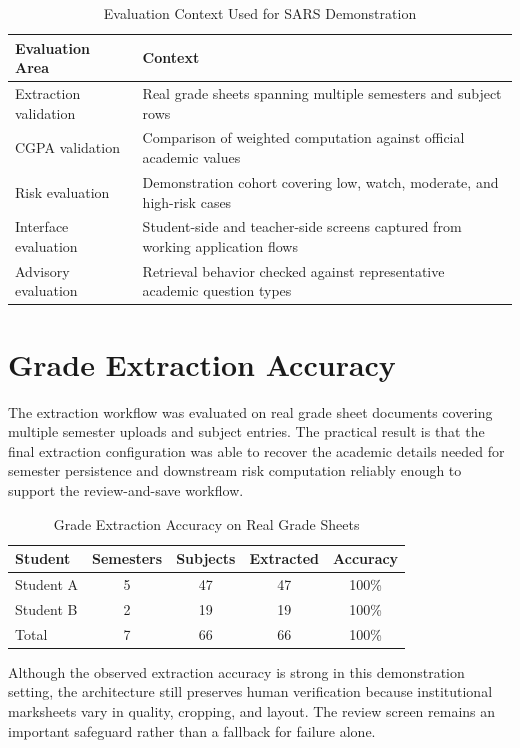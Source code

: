 \begin{table}[H]
\centering
\caption{Evaluation Context Used for SARS Demonstration}
\begin{tabularx}{\textwidth}{>{\raggedright\arraybackslash}p{} >{\raggedright\arraybackslash}X}
\toprule
\textbf{Evaluation Area} & \textbf{Context} \\
\midrule
Extraction validation & Real grade sheets spanning multiple semesters and subject rows \\
CGPA validation & Comparison of weighted computation against official academic values \\
Risk evaluation & Demonstration cohort covering low, watch, moderate, and high-risk cases \\
Interface evaluation & Student-side and teacher-side screens captured from working application flows \\
Advisory evaluation & Retrieval behavior checked against representative academic question types \\
\bottomrule
\end{tabularx}
\end{table}

\section{Grade Extraction Accuracy}
The extraction workflow was evaluated on real grade sheet documents covering multiple semester uploads and subject entries. The practical result is that the final extraction configuration was able to recover the academic details needed for semester persistence and downstream risk computation reliably enough to support the review-and-save workflow.

\begin{table}[H]
\centering
\caption{Grade Extraction Accuracy on Real Grade Sheets}
\begin{tabular}{lcccc}
\toprule
\textbf{Student} & \textbf{Semesters} & \textbf{Subjects} & \textbf{Extracted} & \textbf{Accuracy} \\
\midrule
Student A & 5 & 47 & 47 & 100\% \\
Student B & 2 & 19 & 19 & 100\% \\
Total & 7 & 66 & 66 & 100\% \\
\bottomrule
\end{tabular}
\end{table}

Although the observed extraction accuracy is strong in this demonstration setting, the architecture still preserves human verification because institutional marksheets vary in quality, cropping, and layout. The review screen remains an important safeguard rather than a fallback for failure alone.

